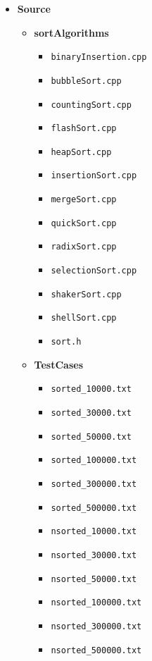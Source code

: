 \begin{itemize}

\item \textbf{Source}

\begin{itemize}

\item \textbf{sortAlgorithms}
\begin{itemize}
    \item \texttt{binaryInsertion.cpp}
    \item \texttt{bubbleSort.cpp}
    \item \texttt{countingSort.cpp}
    \item \texttt{flashSort.cpp}
    \item \texttt{heapSort.cpp}
    \item \texttt{insertionSort.cpp}
    \item \texttt{mergeSort.cpp}
    \item \texttt{quickSort.cpp}
    \item \texttt{radixSort.cpp}
    \item \texttt{selectionSort.cpp}
    \item \texttt{shakerSort.cpp}
    \item \texttt{shellSort.cpp}
    \item \texttt{sort.h}
\end{itemize}

\item \textbf{TestCases}
\begin{itemize}
    \item \texttt{sorted\_10000.txt}
    \item \texttt{sorted\_30000.txt}
    \item \texttt{sorted\_50000.txt}
    \item \texttt{sorted\_100000.txt}
    \item \texttt{sorted\_300000.txt}
    \item \texttt{sorted\_500000.txt}

    \item \texttt{nsorted\_10000.txt}
    \item \texttt{nsorted\_30000.txt}
    \item \texttt{nsorted\_50000.txt}
    \item \texttt{nsorted\_100000.txt}
    \item \texttt{nsorted\_300000.txt}
    \item \texttt{nsorted\_500000.txt}


\end{itemize}
\end{itemize}
\end{itemize}
